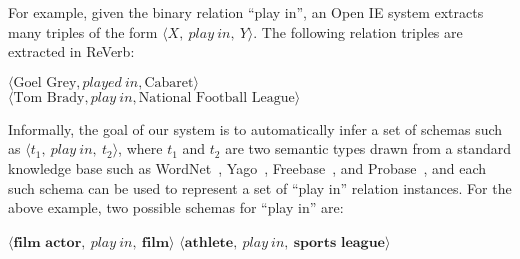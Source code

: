 
For example, given the binary relation ``play in'', an Open IE system
extracts many triples of the form $\langle X,\ play\ in,\ Y \rangle$.
The following relation triples are extracted in ReVerb:

\begin{center}
$\langle \text{Goel Grey}, played\ in, \text{Cabaret} \rangle$ \\
$\langle \text{Tom Brady}, play\ in, \text{National Football League} \rangle$
\end{center}

Informally, the goal of our system is to automatically infer a set of schemas
such as $\langle t_1,~ play~ in,~ t_2 \rangle$, where $t_1$ and $t_2$ are
two semantic types drawn from a standard knowledge base
such as WordNet~\cite{miller1995wordnet},
Yago~\cite{suchanek2007WWW}, Freebase~\cite{bollacker2008freebase},
and Probase~\cite{WuLWZ12}, and each such schema can be used
to represent a set of ``play in''  relation instances.
For the above example, two possible schemas for ``play in'' are:
\begin{center}
$\langle \textbf{film\ actor},\ play\ in,\ \textbf{film} \rangle$
$\langle \textbf{athlete},\ play\ in,\ \textbf{sports\ league} \rangle$
\end{center}

%
%
%

